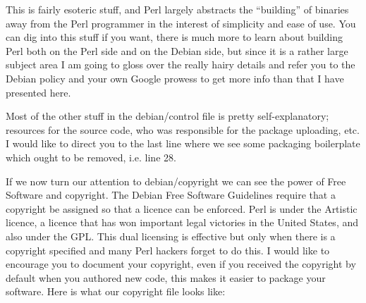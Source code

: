 This is fairly esoteric stuf\hbox{}f, and Perl largely abstracts the ``building'' of
binaries away from the Perl programmer in the interest of simplicity and ease of
use. You can dig into this stuf\hbox{}f if you want, there is much more to learn about
building Perl both on the Perl side and on the Debian side, but since it is a
rather large subject area I am going to gloss over the really hairy details and
refer you to the Debian policy\cite{debs_cpan-debian_policy} and your own Google
prowess to get more info than that I have presented here.

Most of the other stuf\hbox{}f in the debian/control f\hbox{}ile is pretty self-explanatory;
resources for the source code, who was responsible for the package uploading,
etc. I would like to direct you to the last line where we see some packaging
boilerplate which ought to be removed, i.e. line 28.

If we now turn our attention to debian/copyright we can see the power of Free
Software and copyright. The Debian Free Software Guidelines require that a
copyright be assigned so that a licence can be enforced. Perl is under the
Artistic licence, a licence that has won important legal victories in the United
States, and also under the GPL. This dual licensing is ef\hbox{}fective but only when
there is a copyright specif\hbox{}ied and many Perl hackers forget to do this. I would
like to encourage you to document your copyright, even if you received the
copyright by default when you authored new code, this makes it easier to package
your software. Here is what our copyright f\hbox{}ile looks like:

